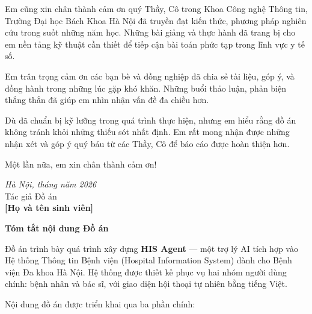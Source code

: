 \documentclass[oneside, a4paper]{book}
\theoremstyle{plain}
\theoremstyle{plain}
\theoremstyle{definition}
\theoremstyle{remark}
\begin{document}
Em cũng xin chân thành cảm ơn quý Thầy, Cô trong Khoa Công nghệ Thông tin, Trường Đại học Bách Khoa Hà Nội đã truyền đạt kiến thức, phương pháp nghiên cứu trong suốt những năm học. Những bài giảng và thực hành đã trang bị cho em nền tảng kỹ thuật cần thiết để tiếp cận bài toán phức tạp trong lĩnh vực y tế số.

Em trân trọng cảm ơn các bạn bè và đồng nghiệp đã chia sẻ tài liệu, góp ý, và đồng hành trong những lúc gặp khó khăn. Những buổi thảo luận, phản biện thẳng thắn đã giúp em nhìn nhận vấn đề đa chiều hơn.

Dù đã chuẩn bị kỹ lưỡng trong quá trình thực hiện, nhưng em hiểu rằng đồ án không tránh khỏi những thiếu sót nhất định. Em rất mong nhận được những nhận xét và góp ý quý báu từ các Thầy, Cô để báo cáo được hoàn thiện hơn.

Một lần nữa, em xin chân thành cảm ơn!

\vspace{1cm}
\hspace{0.5\textwidth}
\begin{minipage}{0.5\textwidth}
    \begin{center}
        \textit{Hà Nội, tháng \hspace{0.4cm} năm 2026} \\
        Tác giả Đồ án \\
        \vspace{2cm}
        \textbf{[Họ và tên sinh viên]}
    \end{center}
\end{minipage}

\bigskip
\newpage

\fontsize{22pt}{16pt}\selectfont
{\bfseries Tóm tắt nội dung Đồ án}
\fontsize{13pt}{16pt}\selectfont
\bigskip
\bigskip

Đồ án trình bày quá trình xây dựng \textbf{HIS Agent} --- một trợ lý AI tích hợp vào Hệ thống Thông tin Bệnh viện (Hospital Information System) dành cho Bệnh viện Đa khoa Hà Nội. Hệ thống được thiết kế phục vụ hai nhóm người dùng chính: bệnh nhân và bác sĩ, với giao diện hội thoại tự nhiên bằng tiếng Việt.

Nội dung đồ án được triển khai qua ba phần chính:
\end{document}
